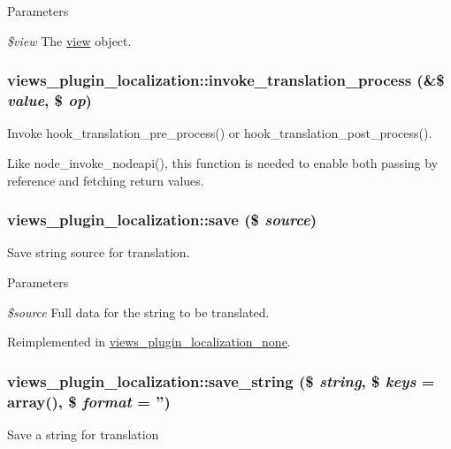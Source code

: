 \begin{DoxyParams}{Parameters}
\item[{\em \$view}]The \hyperlink{classview}{view} object. \end{DoxyParams}
\hypertarget{classviews__plugin__localization_a042053cc792cb7fbd04c7c0e3868fa3d}{
\subsubsection[{invoke\_\-translation\_\-process}]{\setlength{\rightskip}{0pt plus 5cm}views\_\-plugin\_\-localization::invoke\_\-translation\_\-process (\&\$ {\em value}, \/  \$ {\em op})}}
\label{classviews__plugin__localization_a042053cc792cb7fbd04c7c0e3868fa3d}
Invoke hook\_\-translation\_\-pre\_\-process() or hook\_\-translation\_\-post\_\-process().

Like node\_\-invoke\_\-nodeapi(), this function is needed to enable both passing by reference and fetching return values. \hypertarget{classviews__plugin__localization_a28f6f39bb83c3379d123e039287f50ed}{
\subsubsection[{save}]{\setlength{\rightskip}{0pt plus 5cm}views\_\-plugin\_\-localization::save (\$ {\em source})}}
\label{classviews__plugin__localization_a28f6f39bb83c3379d123e039287f50ed}
Save string source for translation.


\begin{DoxyParams}{Parameters}
\item[{\em \$source}]Full data for the string to be translated. \end{DoxyParams}


Reimplemented in \hyperlink{classviews__plugin__localization__none_a8c0a923ab826b285bea27b9c5097effd}{views\_\-plugin\_\-localization\_\-none}.\hypertarget{classviews__plugin__localization_ae3c306214c21380853b27eeb902cadac}{
\subsubsection[{save\_\-string}]{\setlength{\rightskip}{0pt plus 5cm}views\_\-plugin\_\-localization::save\_\-string (\$ {\em string}, \/  \$ {\em keys} = {\ttfamily array()}, \/  \$ {\em format} = {\ttfamily ''})}}
\label{classviews__plugin__localization_ae3c306214c21380853b27eeb902cadac}
Save a string for translation


